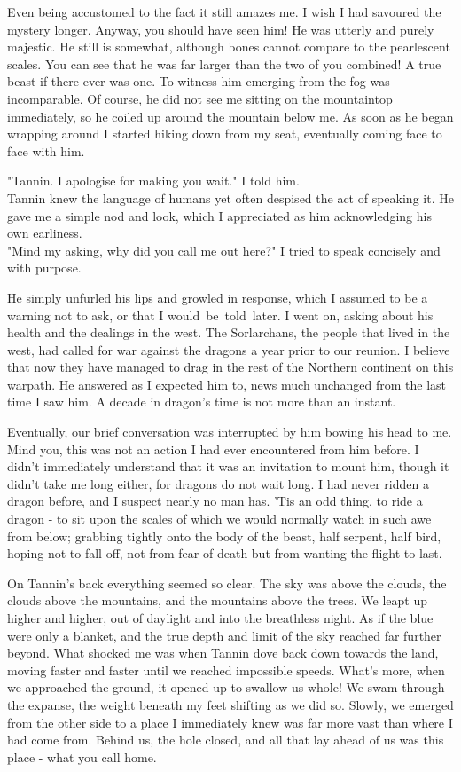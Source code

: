 Even being accustomed to the fact it still amazes me. I wish I had savoured the mystery longer. Anyway, you should have seen him! He was utterly and purely majestic. He still is somewhat, although bones cannot compare to the pearlescent scales. You can see that he was far larger than the two of you combined! A true beast if there ever was one. To witness him emerging from the fog was incomparable. Of course, he did not see me sitting on the mountaintop immediately, so he coiled up around the mountain below me. As soon as he began wrapping around I started hiking down from my seat, eventually coming face to face with him.

"Tannin. I apologise for making you wait." I told him.\\
Tannin knew the language of humans yet often despised the act of speaking it. He gave me a simple nod and look, which I appreciated as him acknowledging his own earliness. \\
"Mind my asking, why did you call me out here?" I tried to speak concisely and with purpose.

He simply unfurled his lips and growled in response, which I assumed to be a warning not to ask, or that I would be told later. I went on, asking about his health and the dealings in the west. The Sorlarchans, the people that lived in the west, had called for war against the dragons a year prior to our reunion. I believe that now they have managed to drag in the rest of the Northern continent on this warpath. He answered as I expected him to, news much unchanged from the last time I saw him. A decade in dragon's time is not more than an instant. 

Eventually, our brief conversation was interrupted by him bowing his head to me. Mind you, this was not an action I had ever encountered from him before. I didn't immediately understand that it was an invitation to mount him, though it didn't take me long either, for dragons do not wait long. I had never ridden a dragon before, and I suspect nearly no man has. 'Tis an odd thing, to ride a dragon - to sit upon the scales of which we would normally watch in such awe from below; grabbing tightly onto the body of the beast, half serpent, half bird, hoping not to fall off, not from fear of death but from wanting the flight to last.

On Tannin's back everything seemed so clear. The sky was above the clouds, the clouds above the mountains, and the mountains above the trees. We leapt up higher and higher, out of daylight and into the breathless night. As if the blue were only a blanket, and the true depth and limit of the sky reached far further beyond. What shocked me was when Tannin dove back down towards the land, moving faster and faster until we reached impossible speeds. What's more, when we approached the ground, it opened up to swallow us whole! We swam through the expanse, the weight beneath my feet shifting as we did so. Slowly, we emerged from the other side to a place I immediately knew was far more vast than where I had come from. Behind us, the hole closed, and all that lay ahead of us was this place - what you call home.

